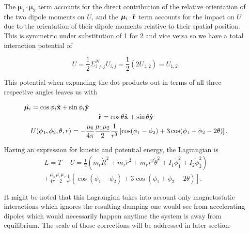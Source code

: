 \documentclass[prbg,preprint]{revtex4-1}
\newcommand{\cvec}[1]{{\rm{\bf{#1}}}}
\begin{document}
The $\boldsymbol \mu_1 \cdot \boldsymbol \mu_2$ term accounts 
for the direct contribution of the relative orientation of the two dipole moments on $U$, 
and the $\boldsymbol \mu_i \cdot \hat {\cvec r}$ term accounts for the impact on $U$ due to the orientation of their dipole moments relative to their spatial position.
This is symmetric under substitution of 1 for 2 and vice versa so we have a total interaction potential of

\begin{equation}
U =
\frac{1}{2} \Sigma_{i\neq j }^N U_{i,j}
= 
\frac{1}{2}(2U_{1,2})
= 
U_{1,2}.
\end{equation}

This potential when expanding the dot products out in terms of all three respective angles leaves us with

\begin{equation}
  \begin{multlined}
\hat {\boldsymbol \mu_i} =  \cos \phi_i \hat {\cvec x} + \sin \phi_i \hat {\cvec y}
\\
\hat {\cvec r} =  \cos \theta \hat {\cvec x} + \sin \theta \hat {\cvec y}
\\
U(\phi_1, \phi_2, \theta, r) =
-\frac{\mu_0}{4\pi}
\frac{\mu_1 \mu_2}{2}
\frac{1}{r^3}\left[
	\cos(\phi_1-\phi_2)
	+3\cos(\phi_1+\phi_2 -2\theta)
\right].
  \end{multlined}
\end{equation}

Having an expression for kinetic and potential energy, the Lagrangian is 
\begin{equation}
  \begin{multlined}
    L=T-U=
    \frac{1}{2}(
        m_t \dot R^2
        +m_r \dot r^2
        +m_r r^2 \dot \theta^2
        + I_1 \dot \phi_1^2
        + I_2 \dot \phi_2^2
    )
    \\
    +
    \frac{\mu_0}{4\pi}
    \frac{\mu_1 \mu_2}{2}
    \frac{1}{r^3}
    [
        \cos(\phi_1-\phi_2)
        +3\cos(\phi_1+\phi_2 -2\theta)
    ].
  \end{multlined}
\end{equation}

It might be noted that this Lagrangian takes into account only magnetostatic interactions which ignores the resulting damping one would see from accelerating dipoles which would necessarily happen anytime the system is away from equilibrium. The scale of those corrections will be addressed in  later section.
\end{document}
